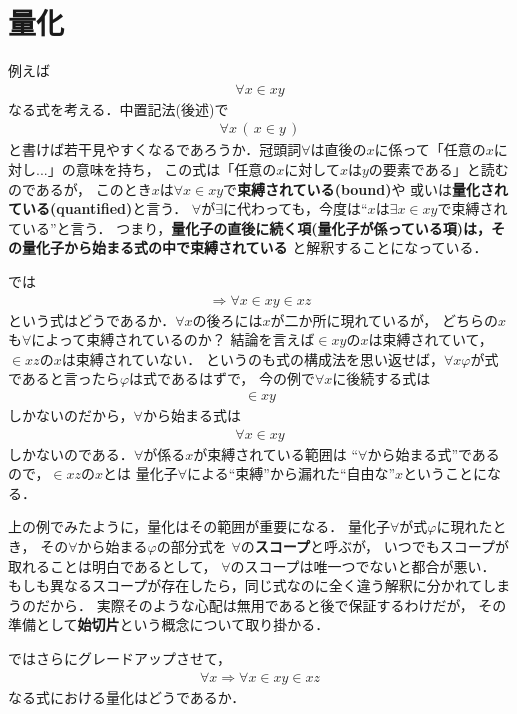 \chapter{量化}
	例えば
	\begin{align}
		\forall x \in x y
	\end{align}
	なる式を考える．中置記法(後述)で
	\begin{align}
		\forall x\, (\, x \in y\, )
	\end{align}
	と書けば若干見やすくなるであろうか．冠頭詞$\forall$は直後の$x$に係って「任意の$x$に対し...」の意味を持ち，
	この式は「任意の$x$に対して$x$は$y$の要素である」と読むのであるが，
	このとき$x$は$\forall x \in x y$で{\bf 束縛されている}{\bf (bound)}や
	或いは{\bf 量化されている}{\bf (quantified)}と言う．
	$\forall$が$\exists$に代わっても，今度は``$x$は$\exists x \in x y$で束縛されている''と言う．
	つまり，{\bf 量化子の直後に続く項(量化子が係っている項)は，その量化子から始まる式の中で束縛されている}
	と解釈することになっている．
	
	では
	\begin{align}
		\Longrightarrow \forall x \in x y \in x z
	\end{align}
	という式はどうであるか．$\forall x$の後ろには$x$が二か所に現れているが，
	どちらの$x$も$\forall$によって束縛されているのか？
	結論を言えば$\in x y$の$x$は束縛されていて，$\in x z$の$x$は束縛されていない．
	というのも式の構成法を思い返せば，$\forall x \varphi$が式であると言ったら$\varphi$は式であるはずで，
	今の例で$\forall x$に後続する式は
	\begin{align}
		\in x y
	\end{align}
	しかないのだから，$\forall$から始まる式は
	\begin{align}
		\forall x \in x y
	\end{align}
	しかないのである．$\forall$が係る$x$が束縛されている範囲は
	``$\forall$から始まる式''であるので，$\in x z$の$x$とは
	量化子$\forall$による``束縛''から漏れた``自由な''$x$ということになる．
	
	上の例でみたように，量化はその範囲が重要になる．
	量化子$\forall$が式$\varphi$に現れたとき，
	その$\forall$から始まる$\varphi$の部分式を
	$\forall$の{\bf スコープ}と呼ぶが，
	いつでもスコープが取れることは明白であるとして，
	$\forall$のスコープは唯一つでないと都合が悪い．
	もしも異なるスコープが存在したら，同じ式なのに全く違う解釈に分かれてしまうのだから．
	実際そのような心配は無用であると後で保証するわけだが，
	その準備として{\bf 始切片}という概念について取り掛かる．
	
	ではさらにグレードアップさせて，
	\begin{align}
		\forall x \Longrightarrow \forall x \in x y \in x z
	\end{align}
	なる式における量化はどうであるか．
	
